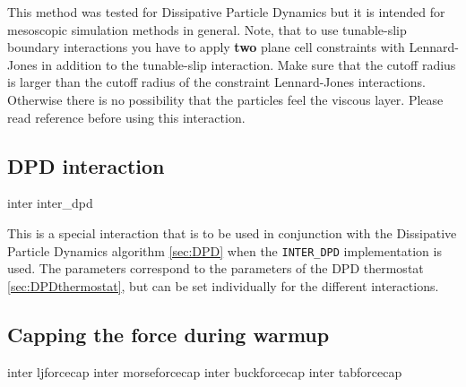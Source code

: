 This method was tested for Dissipative Particle Dynamics but it is
intended for mesoscopic simulation methods in general. Note, that to
use tunable-slip boundary interactions you have to apply \textbf{two}
plane cell constraints with Lennard-Jones in addition to the
tunable-slip interaction. Make sure that the cutoff radius
 is larger than the cutoff radius of the
constraint Lennard-Jones interactions. Otherwise there is no
possibility that the particles feel the viscous layer.  Please read
reference \cite{smiatek08a} before using this interaction.

\subsection{DPD interaction}\label{sec:DPDinter}

\begin{essyntax}
  inter   inter_dpd   
  \begin{features}
  \end{features}
\end{essyntax}

This is a special interaction that is to be used in conjunction with
the Dissipative Particle Dynamics algorithm \ref{sec:DPD} when the
\texttt{INTER_DPD} implementation is used. The parameters correspond
to the parameters of the DPD thermostat \vref{sec:DPDthermostat}, but
can be set individually for the different interactions.

\subsection{Capping the force during warmup}
\label{sec:forcecap}

\begin{essyntax}
   inter ljforcecap 
   inter morseforcecap 
   inter buckforcecap 
   inter tabforcecap 
  \begin{features}
  \end{features}  
\end{essyntax}


